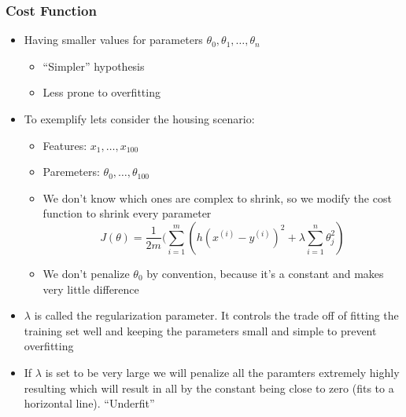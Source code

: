 \subsubsection{Cost Function}
\begin{itemize}[--]
	\item Having smaller values for parameters $\theta_0, \theta_1, \ldots, \theta_n$
	\begin{itemize}[--]
		\item ``Simpler'' hypothesis
		\item Less prone to overfitting
	\end{itemize}

	\item To exemplify lets consider the housing scenario:
	\begin{itemize}[--]
		\item Features: $x_1,\ldots, x_100$
		\item Paremeters: $\theta_0, \ldots, \theta_100$
		\item We don't know which ones are complex to shrink, so we modify the cost function to shrink every parameter
		$$J(\theta )=\frac{1}{2m}(\sum_{i=1}^{m}(h(x^{(i)}-y^{(i)})^2 + \lambda\sum_{i=1}^{n}\theta_j^2)$$
		\item We don't penalize $\theta_0$ by convention, because it's a constant and makes very little difference
	\end{itemize}

	\item $\lambda$ is called the regularization parameter. It controls the trade off of fitting the training set well and keeping the parameters small and simple to prevent overfitting
	\item If $\lambda$ is set to be very large we will penalize all the paramters extremely highly resulting which will result in all by the constant being close to zero (fits to a horizontal line). ``Underfit''
\end{itemize}

